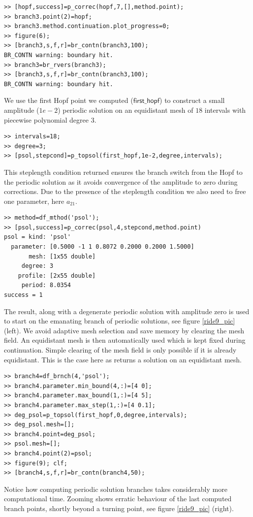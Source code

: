 \documentclass[10pt]{article}
\gdef \file#1{{\bfseries{\ttfamily{#1}}}}
\gdef \parm#1{{\mathsf{#1}}}
\begin{document}
{{\begin{verbatim}
>> [hopf,success]=p_correc(hopf,7,[],method.point);
>> branch3.point(2)=hopf;
>> branch3.method.continuation.plot_progress=0;
>> figure(6);
>> [branch3,s,f,r]=br_contn(branch3,100);
BR_CONTN warning: boundary hit.
>> branch3=br_rvers(branch3);
>> [branch3,s,f,r]=br_contn(branch3,100);
BR_CONTN warning: boundary hit.
\end{verbatim}}
We use the first Hopf point we computed ($\parm{first\_hopf}$)
to construct a small amplitude ($1e-2$)
periodic solution on an equidistant mesh of
$18$ intervals with piecewise polynomial degree $3$.
{\small\begin{verbatim}
>> intervals=18;
>> degree=3;
>> [psol,stepcond]=p_topsol(first_hopf,1e-2,degree,intervals);
\end{verbatim}}
This steplength condition returned ensures the branch switch from the
Hopf to the periodic solution as it avoids convergence of  
the amplitude 
to zero during corrections. Due to the presence of the
steplength condition we also need to
free one parameter, here $a_{21}$.
{\small\begin{verbatim}
>> method=df_mthod('psol');
>> [psol,success]=p_correc(psol,4,stepcond,method.point)
psol = kind: 'psol'
  parameter: [0.5000 -1 1 0.8072 0.2000 0.2000 1.5000]
       mesh: [1x55 double]
     degree: 3
    profile: [2x55 double]
     period: 8.0354
success = 1
\end{verbatim}}
The result, along with a degenerate periodic solution with amplitude
zero is used to start on the emanating branch of periodic solutions,
see figure \ref{ride9_pic} (left). We avoid adaptive 
mesh selection and save memory by clearing the mesh field. 
An equidistant mesh is then automatically used which is kept
fixed during continuation. Simple clearing of the mesh field
is only  possible if it is already equidistant. This is the case
here as \file{p\_tohopf} returns a solution on an
equidistant mesh. 
{\small\begin{verbatim}
>> branch4=df_brnch(4,'psol');
>> branch4.parameter.min_bound(4,:)=[4 0];
>> branch4.parameter.max_bound(1,:)=[4 5];
>> branch4.parameter.max_step(1,:)=[4 0.1];
>> deg_psol=p_topsol(first_hopf,0,degree,intervals);
>> deg_psol.mesh=[];
>> branch4.point=deg_psol;
>> psol.mesh=[];
>> branch4.point(2)=psol;
>> figure(9); clf;
>> [branch4,s,f,r]=br_contn(branch4,50);
\end{verbatim}}
Notice how computing periodic solution branches takes 
considerably more
computational time.
Zooming shows erratic behaviour of the last computed 
branch points, shortly beyond a turning point, see figure \ref{ride9_pic} (right).
}
\end{document}
